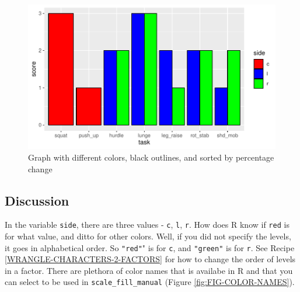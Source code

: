 \documentclass[
]{book}
\begin{document}
\begin{figure}

{\centering \includegraphics{se201_stats_book_files/figure-latex/FIG-BAR-GRAPH-FILL-MANUAL-1} 

}

\caption[Graph with different colors, black outlines, and sorted by percentage change]{Graph with different colors, black outlines, and sorted by percentage change}\label{fig:FIG-BAR-GRAPH-FILL-MANUAL}
\end{figure}

\hypertarget{discussion-10}{%
\subsection{Discussion}\label{discussion-10}}

In the variable \texttt{side}, there are three values - \texttt{c}, \texttt{l}, \texttt{r}. How does R know if \texttt{red} is for what value, and ditto for other colors. Well, if you did not specify the levels, it goes in alphabetical order. So \texttt{"red"}" is for \texttt{c}, and \texttt{"green"} is for \texttt{r}. See Recipe \ref{WRANGLE-CHARACTERS-2-FACTORS} for how to change the order of levels in a factor. There are plethora of color names that is availabe in R and that you can select to be used in \texttt{scale\_fill\_manual} (Figure \ref{fig:FIG-COLOR-NAMES}).
\end{document}
